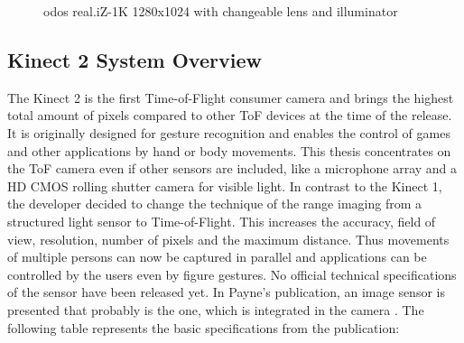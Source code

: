  \begin{figure}[!h]
 	\centering
 	\caption{odos real.iZ-1K 1280x1024 with changeable lens and illuminator}
 	\label{fig:odos_real_iK_1K}
 \end{figure} 


\subsection{Kinect 2 System Overview}
The Kinect 2 is the first Time-of-Flight consumer camera and brings the highest total amount of pixels compared to other ToF devices at the time of the release. It is originally designed for gesture recognition and enables the control of games and other applications by hand or body movements. This thesis concentrates on the ToF camera even if other sensors are included, like a microphone array and a HD CMOS rolling shutter camera for visible light. In contrast to the Kinect 1, the developer decided to change the technique of the range imaging from a structured light sensor to Time-of-Flight. This increases the accuracy, field of view, resolution, number of pixels and the maximum distance. Thus movements of multiple persons can now be captured in parallel and applications can be controlled by the users even by figure gestures. No official technical specifications of the sensor have been released yet. In Payne's publication, an image sensor is presented that probably is the one, which is integrated in the camera \cite{payne20147}. The following table represents the basic specifications from the publication:
\medskip

